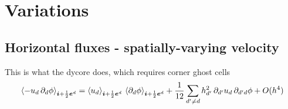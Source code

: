 \documentclass[11pt]{article}
\begin{document}
\section{Variations}

\subsection{Horizontal fluxes - spatially-varying velocity}
This is what the dycore does, which requires corner ghost cells
\begin{equation}
  \left\langle - u_d \, \partial_d \phi \right\rangle_{{\boldsymbol{i}}+\frac{1}{2}{\boldsymbol{e}}^d} = \left\langle u_d \right\rangle_{{\boldsymbol{i}}+\frac{1}{2}{\boldsymbol{e}}^d} 
    \, \left\langle \partial_d \phi \right\rangle_{{\boldsymbol{i}}+\frac{1}{2}{\boldsymbol{e}}^d} + 
  \frac{1}{12}\sum_{d'\neq d}
  h_{d'}^2 \, {\partial_{d'} u_d} \, {\partial_{d' d} \phi}  +
  O(h^4) \\
\end{equation}
\end{document}

